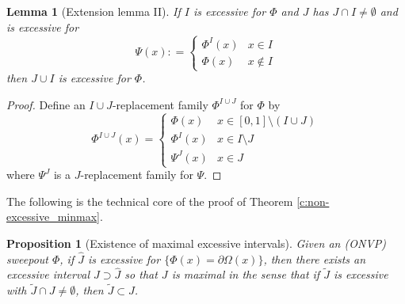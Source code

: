 \documentclass[12pt,twoside]{amsart}
\numberwithin{equation}{section}
\newtheorem{lemma}[theorem]{Lemma}
\newtheorem{proposition}[theorem]{Proposition}
\begin{document}
\begin{lemma}[Extension lemma II]\label{l:union-excessive-repeated}
If $I$ is excessive for $\Phi$ and $J$ has $J\cap I \neq \emptyset$ and is excessive for
\[
\Psi(x) : = \begin{cases} \Phi^I(x) & x \in I \\ \Phi(x) & x \not \in I \end{cases}
\]
then $J \cup I$ is excessive for $\Phi$. 
\end{lemma}
\begin{proof}
Define an $I\cup J$-replacement family $\Phi^{I\cup J}$ for $\Phi$ by
\[
\Phi^{I\cup J}(x) = \begin{cases} 
\Phi(x) & x \in 
[0,1] \setminus (I \cup J) \\
\Phi^I(x) & x\in I \setminus J \\
\Psi^J(x) & x \in J
\end{cases}
\]
where $\Psi^J$ is a $J$-replacement family for $\Psi$. 
\end{proof}

The following is the technical core of the proof of Theorem \ref{c:non-excessive_minmax}. 

\begin{proposition}[Existence of maximal excessive intervals]\label{p:max_int}
Given an (ONVP) sweepout $\Phi$, if $\hat J$ is excessive for $\{\Phi(x)=\partial\Omega(x)\}$, then there exists an excessive interval $J \supset \hat J$ so that $J$ is maximal in the sense that if $\tilde J$ is excessive with $\tilde J \cap J \not = \emptyset$, then $\tilde J \subset J$. 
\end{proposition}
\end{document}
